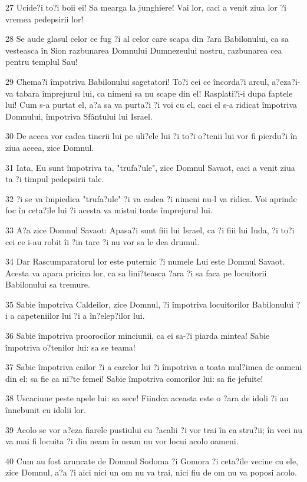 \par 27 Ucide?i to?i boii ei! Sa mearga la junghiere! Vai lor, caci a venit ziua lor ?i vremea pedepsirii lor!
\par 28 Se aude glasul celor ce fug ?i al celor care scapa din ?ara Babilonului, ca sa vesteasca în Sion razbunarea Domnului Dumnezeului nostru, razbunarea cea pentru templul Sau!
\par 29 Chema?i împotriva Babilonului sagetatori! To?i cei ce încorda?i arcul, a?eza?i-va tabara împrejurul lui, ca nimeni sa nu scape din el! Rasplati?i-i dupa faptele lui! Cum s-a purtat el, a?a sa va purta?i ?i voi cu el, caci el s-a ridicat împotriva Domnului, împotriva Sfântului lui Israel.
\par 30 De aceea vor cadea tinerii lui pe uli?ele lui ?i to?i o?tenii lui vor fi pierdu?i în ziua aceea, zice Domnul.
\par 31 Iata, Eu sunt împotriva ta, "trufa?ule", zice Domnul Savaot, caci a venit ziua ta ?i timpul pedepsirii tale.
\par 32 ?i se va împiedica "trufa?ule" ?i va cadea ?i nimeni nu-l va ridica. Voi aprinde foc în ceta?ile lui ?i acesta va mistui toate împrejurul lui.
\par 33 A?a zice Domnul Savaot: Apasa?i sunt fiii lui Israel, ca ?i fiii lui Iuda, ?i to?i cei ce i-au robit îi ?in tare ?i nu vor sa le dea drumul.
\par 34 Dar Rascumparatorul lor este puternic ?i numele Lui este Domnul Savaot. Acesta va apara pricina lor, ca sa lini?teasca ?ara ?i sa faca pe locuitorii Babilonului sa tremure.
\par 35 Sabie împotriva Caldeilor, zice Domnul, ?i împotriva locuitorilor Babilonului ?i a capeteniilor lui ?i a în?elep?ilor lui.
\par 36 Sabie împotriva proorocilor minciunii, ca ei sa-?i piarda mintea! Sabie împotriva o?tenilor lui: sa se teama!
\par 37 Sabie împotriva cailor ?i a carelor lui ?i împotriva a toata mul?imea de oameni din el: sa fie ca ni?te femei! Sabie împotriva comorilor lui: sa fie jefuite!
\par 38 Uscaciune peste apele lui: sa sece! Fiindca aceasta este o ?ara de idoli ?i au înnebunit cu idolii lor.
\par 39 Acolo se vor a?eza fiarele pustiului cu ?acalii ?i vor trai în ea stru?ii; în veci nu va mai fi locuita ?i din neam în neam nu vor locui acolo oameni.
\par 40 Cum au fost aruncate de Domnul Sodoma ?i Gomora ?i ceta?ile vecine cu ele, zice Domnul, a?a ?i aici nici un om nu va trai, nici fiu de om nu va poposi acolo.
